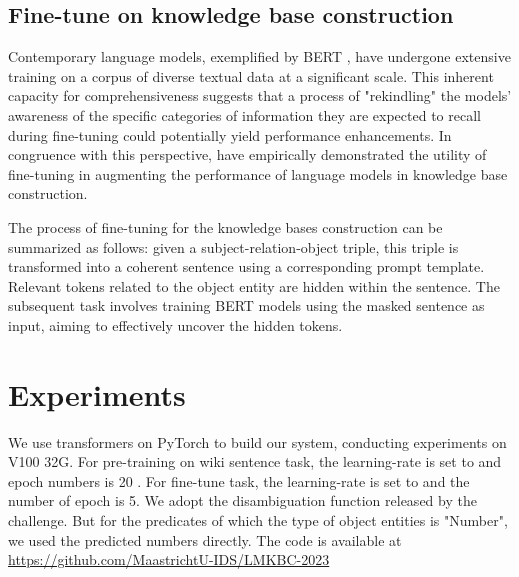 \documentclass[]{ceurart}
\begin{document}
\subsection{Fine-tune on knowledge base construction}
\label{sec-fine-tune}
Contemporary language models, exemplified by BERT \cite{devlin_bert_2019}, have undergone extensive training on a corpus of diverse textual data at a significant scale. This inherent capacity for comprehensiveness suggests that a process of "rekindling" the models' awareness of the specific categories of information they are expected to recall during fine-tuning could potentially yield performance enhancements. In congruence with this perspective,  \cite{li_task-specific_2022} have empirically demonstrated the utility of fine-tuning in augmenting the performance of language models in knowledge base construction.

The process of fine-tuning for the knowledge bases construction can be summarized as follows: given a subject-relation-object triple, this triple is transformed into a coherent sentence using a corresponding prompt template.  Relevant tokens related to the object entity are hidden within the sentence. The subsequent task involves training BERT models using the masked sentence as input, aiming to effectively uncover the hidden tokens.


\section{Experiments}
We use transformers on PyTorch to build our system, conducting experiments on V100 32G. For pre-training on wiki sentence task, the learning-rate is set to   and epoch numbers is 20 . For fine-tune task, the learning-rate is set to  and the number of epoch is 5. We adopt the disambiguation function released by the challenge. But for the predicates of which the type of object entities is "Number", we used the predicted numbers directly.  The code is available at \href{https://github.com/MaastrichtU-IDS/LMKBC-2023}{https://github.com/MaastrichtU-IDS/LMKBC-2023}  
\end{document}
